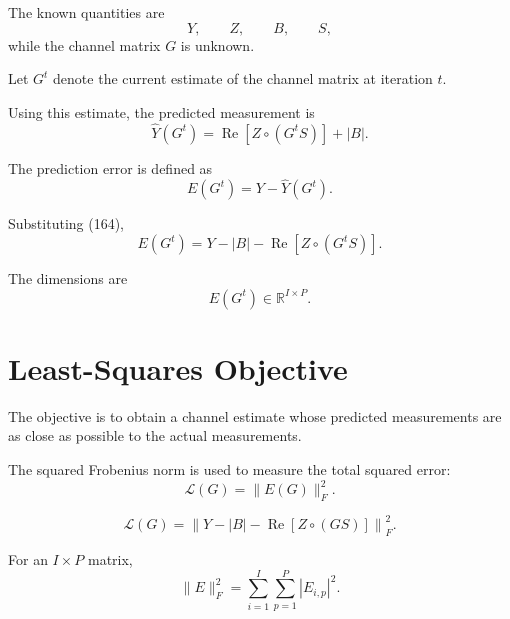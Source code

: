 \documentclass[12pt,a4paper]{article}
\begin{document}
The known quantities are
\begin{equation}
Y,
\qquad
Z,
\qquad
B,
\qquad
S,
\tag{163}
\end{equation}
while the channel matrix $G$ is unknown.

Let $G^{t}$ denote the current estimate of the channel matrix at
iteration $t$.

Using this estimate, the predicted measurement is
\begin{equation}
\boxed{
\widehat Y(G^{t})
=
\operatorname{Re}[Z\circ(G^{t}S)]
+
|B|
}.
\tag{164}
\end{equation}

The prediction error is defined as
\begin{equation}
\boxed{
E(G^{t})
=
Y-\widehat Y(G^{t})
}.
\tag{165}
\end{equation}

Substituting (164),
\begin{equation}
\boxed{
E(G^{t})
=
Y
-
|B|
-
\operatorname{Re}[Z\circ(G^{t}S)]
}.
\tag{166}
\end{equation}

The dimensions are
\begin{equation}
E(G^{t})
\in
\mathbb{R}^{I\times P}.
\tag{167}
\end{equation}

\section{Least-Squares Objective}

The objective is to obtain a channel estimate whose predicted
measurements are as close as possible to the actual measurements.

The squared Frobenius norm is used to measure the total squared
error:
\begin{equation}
\boxed{
\mathcal L(G)
=
\|E(G)\|_F^2
}.
\tag{168}
\end{equation}

\begin{equation}
\boxed{
\mathcal L(G)
=
\left\|
Y-|B|-\operatorname{Re}[Z\circ(GS)]
\right\|_F^2
}.
\tag{169}
\end{equation}

For an $I\times P$ matrix,
\begin{equation}
\|E\|_F^2
=
\sum_{i=1}^{I}
\sum_{p=1}^{P}
|E_{i,p}|^2.
\tag{170}
\end{equation}
\end{document}
